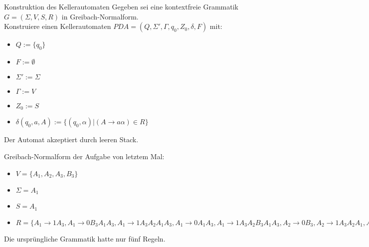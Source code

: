 \documentclass{beamer}
\begin{document}
\begin{frame}
 \begin{block}{Konstruktion des Kellerautomaten}
 Gegeben sei eine kontextfreie Grammatik \(G = (\Sigma, V, S, R)\) in Greibach-Normalform.\\
 Konstruiere einen Kellerautomaten \(PDA = (Q, \Sigma', \Gamma, q_0, Z_0, \delta, F)\) mit:
 \begin{itemize}
  \item $Q := \{q_0\}$
  \item $F := \emptyset$
  \item $\Sigma' := \Sigma$
  \item $\Gamma := V$
  \item $Z_0 := S$
  \item $\delta(q_0, a, A) :=  \{(q_0,\alpha) | (A \rightarrow a \alpha) \in R \}$
 \end{itemize}
 \end{block}
 \pause
 Der Automat akzeptiert durch leeren Stack.
\end{frame}

\begin{frame}
Greibach-Normalform der Aufgabe von letztem Mal:
\begin{itemize}
 \item $V=\{A_1, A_2, A_3, B_3\}$
 \item $\Sigma = A_1$
 \item $S = A_1$
 \item $R = \{A_1 \rightarrow 1A_3, A_1 \rightarrow 0B_3A_1A_3, A_1 \rightarrow 1A_3A_2A_1A_3, A_1 \rightarrow 0A_1A_3, A_1 \rightarrow 1A_3A_2B_3A_1A_3,
 A_2 \rightarrow 0B_3, A_2 \rightarrow 1A_3A_2A_1, A_2 \rightarrow 0A_1, A_2 \rightarrow 1A_3A_2B_3A_1, A_2 \rightarrow 1,
 A_3 \rightarrow 0B_3, A_3 \rightarrow 1A_3A_2B_3, A_3 \rightarrow 1A_3A_2, A_3 \rightarrow 0,
 B_3 \rightarrow 1A_3A_2A_2, B_3 \rightarrow 0B_3A_1A_3A_3A_2, B_3 \rightarrow 1A_3A_2A_1A_3A_3A_2, B_3 \rightarrow 0A_1A_3A_3A_2,
 B_3 \rightarrow 1A_3A_2B_3A_1A_3A_3A_2, B_3 \rightarrow 1A_3A_3A_2B_3, B_3 \rightarrow 0B_3A_1A_3A_3A_2B_3, B_3 \rightarrow 1A_3A_2A_1A_3A_3A_2B_3
 B_3 \rightarrow 0A_1A_3A_3A_2B_3, B_3 \rightarrow 1A_3A_2B_3A_1A_3A_3A_2B_3
 \}$
\end{itemize}
\pause
Die ursprüngliche Grammatik hatte nur fünf Regeln.
\end{frame}
\end{document}

